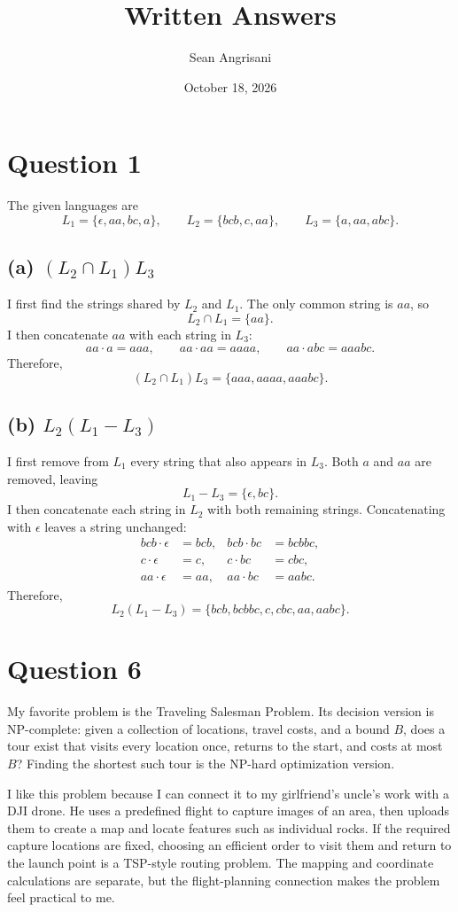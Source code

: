 \documentclass[11pt]{article}
\title{Written Answers}
\author{Sean Angrisani}
\date{October 18, 2026}
\begin{document}
\maketitle

\section*{Question 1}
The given languages are
\[
L_1=\{\epsilon,aa,bc,a\},\qquad
L_2=\{bcb,c,aa\},\qquad
L_3=\{a,aa,abc\}.
\]

\subsection*{(a) $(L_2\cap L_1)L_3$}
I first find the strings shared by $L_2$ and $L_1$. The only common string is $aa$, so
\[
L_2\cap L_1=\{aa\}.
\]
I then concatenate $aa$ with each string in $L_3$:
\[
aa\cdot a=aaa,\qquad aa\cdot aa=aaaa,\qquad aa\cdot abc=aaabc.
\]
Therefore,
\[
\boxed{(L_2\cap L_1)L_3=\{aaa,aaaa,aaabc\}.}
\]

\subsection*{(b) $L_2(L_1-L_3)$}
I first remove from $L_1$ every string that also appears in $L_3$. Both $a$ and $aa$ are removed, leaving
\[
L_1-L_3=\{\epsilon,bc\}.
\]
I then concatenate each string in $L_2$ with both remaining strings. Concatenating with $\epsilon$ leaves a string unchanged:
\[
\begin{aligned}
bcb\cdot\epsilon&=bcb, & bcb\cdot bc&=bcbbc,\\
c\cdot\epsilon&=c, & c\cdot bc&=cbc,\\
aa\cdot\epsilon&=aa, & aa\cdot bc&=aabc.
\end{aligned}
\]
Therefore,
\[
\boxed{L_2(L_1-L_3)=\{bcb,bcbbc,c,cbc,aa,aabc\}.}
\]

\clearpage
\section*{Question 6}
My favorite problem is the Traveling Salesman Problem. Its decision version is NP-complete: given a collection of locations, travel costs, and a bound $B$, does a tour exist that visits every location once, returns to the start, and costs at most $B$? Finding the shortest such tour is the NP-hard optimization version.

I like this problem because I can connect it to my girlfriend's uncle's work with a DJI drone. He uses a predefined flight to capture images of an area, then uploads them to create a map and locate features such as individual rocks. If the required capture locations are fixed, choosing an efficient order to visit them and return to the launch point is a TSP-style routing problem. The mapping and coordinate calculations are separate, but the flight-planning connection makes the problem feel practical to me.
\end{document}
